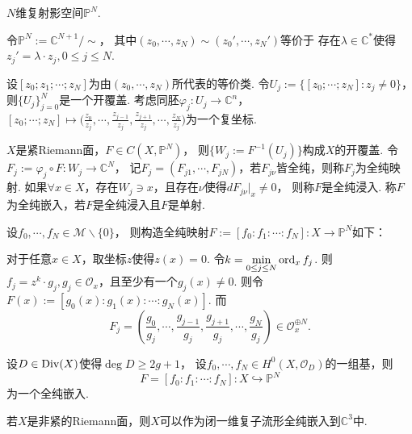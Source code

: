 \begin{definition}
    $N$维复射影空间$\mathbb{P}^N$.

	令$\mathbb{P}^N:=\mathbb{C}^{N+1}/\sim$，
    其中$(z_0,\cdots,z_N)\sim (z_0',\cdots,z_N')$等价于
    存在$\lambda\in \mathbb{C}^*$使得$z_j'=\lambda\cdot z_j, 0\leq j\leq N$.

	设$[z_0;z_1;\cdots;z_N]$为由$(z_0,\cdots,z_N)$所代表的等价类. 
    令$U_j:=\{[z_0;\cdots;z_N]: z_j\neq 0\}$，则$\{U_j\}_{j=0}^N$是一个开覆盖. 
    考虑同胚$\varphi_j\colon U_j\rightarrow \mathbb{C}^n$，
    $[z_0;\cdots;z_N]\mapsto \big(\frac{z_0}{z_j},\cdots,\frac{z_{j-1}}{z_j} ,
    \frac{z_{j+1}}{z_j},\cdots,\frac{z_N}{z_{j}}\big)$为一个复坐标.
\end{definition}

\begin{definition}
	$X$是紧Riemann面，$F\in C(X,\mathbb{P}^N)$，
    则$\{W_j:=F^{-1}(U_j)\}$构成$X$的开覆盖. 
    令$F_j:=\varphi_j \circ F\colon W_j\rightarrow \mathbb{C}^N$，
    记$F_j=(F_{j1},\cdots,F_{jN})$，若$F_{j\nu}$皆全纯，则称$F_j$为全纯映射. 
    如果$\forall x\in X$，存在$W_j \ni x$，且存在$\nu$使得$dF_{j\nu}|_x\neq 0$，
    则称$F$是全纯浸入. 称$F$为全纯嵌入，若$F$是全纯浸入且$F$是单射.
\end{definition}

设$f_0,\cdots,f_N\in \mathscr{M}\backslash \{0\}$，
则构造全纯映射$F:=[f_0:f_1:\cdots:f_N]\colon X\rightarrow \mathbb{P}^N$如下：

对于任意$x\in X$，取坐标$z$使得$z(x)=0$. 
令$k=\min\limits_{0\leq j\leq N} \operatorname{ord}_x f_j$. 
则$f_j=z^k\cdot g_j, g_j\in \mathcal{O}_x$，且至少有一个$g_j(x) \neq 0$. 
则令$F(x):=[g_0(x):g_1(x):\cdots:g_N(x)]$. 而
$$F_j=\left(\frac{g_0}{g_j},\cdots,\frac{g_{j-1}}{g_j},\frac{g_{j+1}}{g_j},
\cdots, \frac{g_N}{g_j}\right)\in \mathcal{O}_x^{\oplus N}.$$
			
\begin{theorem}
	设$D\in \operatorname{Div}(X)$使得$\deg D\geq 2g+1$，
    设$f_0,\cdots,f_N\in H^0(X, \mathcal{O}_D)$的一组基，则
	$$F=[f_0:f_1:\cdots:f_N]\colon X\hookrightarrow \mathbb{P}^N$$
    为一个全纯嵌入.
\end{theorem}

\begin{remark}[多复变]
	若$X$是非紧的Riemann面，则$X$可以作为闭一维复子流形全纯嵌入到$\mathbb{C}^3$中.
\end{remark}

